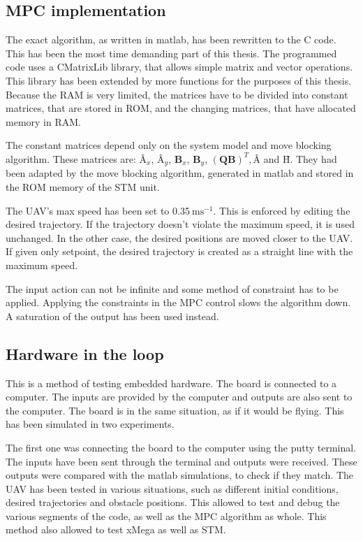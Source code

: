 \documentclass[a4paper,11pt,titlepage]{article}
\newcommand{\jed}[1]{\ensuremath{~\mathrm{#1}}}
\begin{document}
\subsection{MPC implementation}

The exact algorithm, as written in matlab, has been rewritten to the C code. This has been the most time demanding part of this thesis. The programmed code uses a CMatrixLib library, that allows simple matrix and vector operations. This library has been extended by more functions for the purposes of this thesis. Because the RAM is very limited, the matrices have to be divided into constant matrices, that are stored in ROM, and the changing matrices, that have allocated memory in RAM.

The constant matrices depend only on the system model and move blocking algorithm. These matrices are: $\textbf{\^A}_x$, $\textbf{\^A}_y$, $\textbf{\^B}_x$, $\textbf{\^B}_y$, $(\textbf{\^Q}\textbf{\^B})^T, \textbf{\^A}$ and $\textbf{\^H}$. They had been adapted by the move blocking algorithm, generated in matlab and stored in the ROM memory of the STM unit. 

The UAV's max speed has been set to 0.35\jed{ms^{-1}}. This is enforced by editing the desired trajectory. If the trajectory doesn't violate the maximum speed, it is used unchanged. In the other case, the desired positions are moved closer to the UAV. If given only setpoint, the desired trajectory is created as a straight line with the maximum speed. 

The input action can not be infinite and some method of constraint has to be applied. Applying the constraints in the MPC control slows the algorithm down. A saturation of the output has been used instead.


\subsection{Hardware in the loop}
This is a method of testing embedded hardware. The board is connected to a computer. The inputs are provided by the computer and outputs are also sent to the computer. The board is in the same situation, as if it would be flying. This has been simulated in two experiments. 

The first one was connecting the board to the computer using the putty terminal. The inputs have been sent through the terminal and outputs were received. These outputs were compared with the matlab simulations, to check if they match. The UAV has been tested in various situations, such as different initial conditions, desired trajectories and obstacle positions. This allowed to test and debug the various segments of the code, as well as the MPC algorithm as whole. This method also allowed to test xMega as well as STM.
\end{document}
